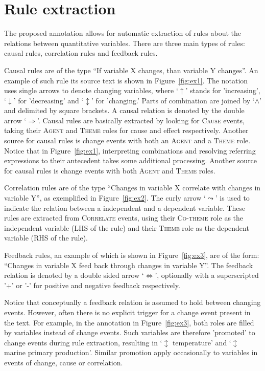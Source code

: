 \documentclass[10pt, a4paper]{article}
\newcommand{\tag}[1]{\textsc{#1}}
\begin{document}
\section{Rule extraction}
\label{sec:extraction}

The proposed annotation allows for automatic extraction of rules about the relations between quantitative variables.
There are three main types of rules: causal rules, correlation rules and feedback rules.

Causal rules are of the type ``If variable X changes, than variable Y changes''.
An example of such rule its source text is shown in Figure~\ref{fig:ex1}.
The notation uses single arrows to denote changing variables, where `$\uparrow$' stands for 'increasing', `$\downarrow$' for 'decreasing' and `$\updownarrow$' for 'changing.'
Parts of combination are joined by `$\wedge$' and delimited by square brackets.
A causal relation is denoted by the double arrow `$\Longrightarrow$'.
Causal rules are basically extracted by looking for \tag{Cause} events, taking their \tag{Agent} and \tag{Theme} roles for cause and effect respectively.
Another source for causal rules is change events with both an \tag{Agent} and a \tag{Theme} role.
Notice that in Figure~\ref{fig:ex1}, interpreting combinations and resolving referring expressions to their antecedent takes some additional processing.
Another source for causal rules is change events with both \tag{Agent} and \tag{Theme} roles.

Correlation rules are of the type ``Changes in variable X correlate with changes in variable Y'', as exemplified in Figure~\ref{fig:ex2}.
The curly arrow `$\leadsto$' is used to indicate the relation between a independent and a dependent variable.
These rules are extracted from \tag{Correlate} events, using their \tag{Co-theme} role as the independent variable (LHS of the rule) and their \tag{Theme} role as the dependent variable (RHS of the rule). 

Feedback rules, an example of which is shown in Figure~\ref{fig:ex3}, are of the form: ``Changes in variable X feed back through changes in variable Y''.
The feedback relation is denoted by a double sided arrow `$\Longleftrightarrow$', optionally with a superscripted '+' or '-' for positive and negative feedback respectively.

Notice that conceptually a feedback relation is assumed to hold between changing events.
However, often there is no explicit trigger for a change event present in the text.
For example, in the annotation in Figure~\ref{fig:ex3}, both roles are filled by variables instead of change events.
Such variables are therefore 'promoted' to change events during rule extraction, resulting in `$\updownarrow$ temperature' and `$\updownarrow$ marine primary production'.
Similar promotion apply occasionally to variables in events of change, cause or correlation.
\end{document}
